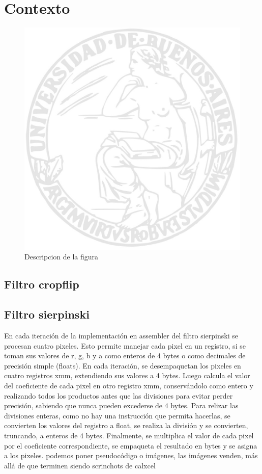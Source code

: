 \documentclass[a4paper]{article}
\begin{document}
\section{Contexto}

\begin{figure}
  \begin{center}
	\includegraphics[scale=0.66]{imagenes/logouba.jpg}
	\caption{Descripcion de la figura}
	\label{nombreparareferenciar}
  \end{center}
\end{figure}


\subsection{Filtro cropflip}

\subsection{Filtro sierpinski}
En cada iteración de la implementación en assembler del filtro sierpinski se procesan cuatro pixeles. Esto permite manejar cada pixel en un registro, si se toman sus valores de r, g, b y a como enteros de 4 bytes o como decimales de precisión simple (floats). En cada iteración, se desempaquetan los pixeles en cuatro registros xmm, extendiendo sus valores a 4 bytes. Luego calcula el valor del coeficiente de cada pixel en otro registro xmm, conservándolo como entero y realizando todos los productos antes que las divisiones para evitar perder precisión, sabiendo que nunca pueden excederse de 4 bytes. Para relizar las divisiones enteras, como no hay una instrucción que permita hacerlas, se convierten los valores del registro a float, se realiza la división y se convierten, truncando, a enteros de 4 bytes. Finalmente, se multiplica el valor de cada pixel por el coeficiente correspondiente, se empaqueta el resultado en bytes y se asigna a los pixeles.
{podemos poner pseudocódigo o imágenes, las imágenes venden, más allá de que terminen siendo scrinchots de calxcel}
\end{document}
